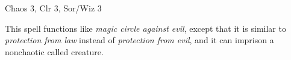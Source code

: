 
\begin{description*}
\item[Level:] Chaos 3, Clr 3, Sor/Wiz 3
\end{description*}

This spell functions like \textit{magic circle against evil}, except that it is
similar to \textit{protection from law} instead of \textit{protection from evil},
and it can imprison a nonchaotic called creature.